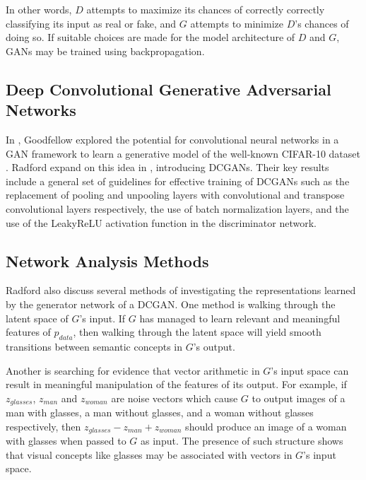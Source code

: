 \documentclass[10pt,twocolumn,letterpaper]{article}
\begin{document}
In other words, $ D $ attempts to maximize its chances of correctly correctly classifying its input
as real or fake, and $ G $ attempts to minimize $ D $'s chances of doing so. If suitable choices
are made for the model architecture of $ D $ and $ G $, GANs may be trained using backpropagation.

\subsection{Deep Convolutional Generative Adversarial Networks}
In \cite{goodfellow2014generative}, Goodfellow \etal explored the potential for convolutional neural
networks in a GAN framework to learn a generative model of the well-known CIFAR-10 dataset
\cite{krizhevsky2014cifar}. Radford \etal expand on this idea in \cite{radford2015unsupervised},
introducing DCGANs. Their key results include a general set of guidelines for effective training of
DCGANs such as the replacement of pooling and unpooling layers with convolutional and transpose
convolutional layers respectively, the use of batch normalization layers, and the use of the LeakyReLU
activation function \cite{maas2013rectifier} in the discriminator network.

\subsection{Network Analysis Methods}
Radford \etal also discuss several methods of investigating the representations learned by the generator
network of a DCGAN. One method is walking through the latent space of $ G $'s input. If $ G $ has managed
to learn relevant and meaningful features of $ p_{data} $, then walking through the latent space will
yield smooth transitions between semantic concepts in $ G $'s output.

Another is searching for evidence that vector arithmetic in $ G $'s input space can result in meaningful
manipulation of the features of its output. For example, if $ z_{glasses} $, $ z_{man} $ and $ z_{woman} $
are noise vectors which cause $ G $ to output images of a man with glasses, a man without glasses, and a
woman without glasses respectively, then $ z_{glasses} - z_{man} + z_{woman} $ should produce an image of
a woman with glasses when passed to $ G $ as input. The presence of such structure shows that visual concepts
like glasses may be associated with vectors in $ G $'s input space.
\end{document}
